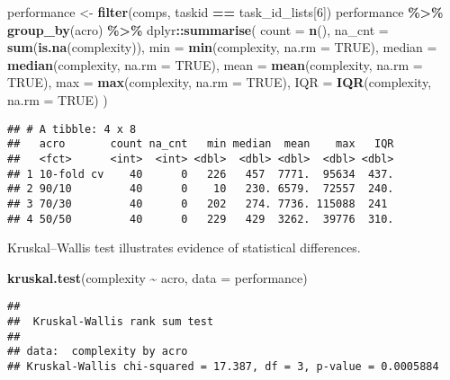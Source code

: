 \documentclass[
]{book}
\newenvironment{Shaded}{\begin{snugshade}}{\end{snugshade}}
\newcommand{\AttributeTok}[1]{\textcolor[rgb]{0.13,0.29,0.53}{#1}}
\newcommand{\ConstantTok}[1]{\textcolor[rgb]{0.56,0.35,0.01}{#1}}
\newcommand{\DecValTok}[1]{\textcolor[rgb]{0.00,0.00,0.81}{#1}}
\newcommand{\FunctionTok}[1]{\textcolor[rgb]{0.13,0.29,0.53}{\textbf{#1}}}
\newcommand{\NormalTok}[1]{#1}
\newcommand{\OtherTok}[1]{\textcolor[rgb]{0.56,0.35,0.01}{#1}}
\newcommand{\SpecialCharTok}[1]{\textcolor[rgb]{0.81,0.36,0.00}{\textbf{#1}}}
\begin{document}
\begin{Shaded}
\begin{Highlighting}[]
\NormalTok{performance }\OtherTok{\textless{}{-}} \FunctionTok{filter}\NormalTok{(comps, taskid }\SpecialCharTok{==}\NormalTok{ task\_id\_lists[}\DecValTok{6}\NormalTok{])}
\NormalTok{performance }\SpecialCharTok{\%\textgreater{}\%}
  \FunctionTok{group\_by}\NormalTok{(acro) }\SpecialCharTok{\%\textgreater{}\%}
\NormalTok{  dplyr}\SpecialCharTok{::}\FunctionTok{summarise}\NormalTok{(}
    \AttributeTok{count =} \FunctionTok{n}\NormalTok{(),}
    \AttributeTok{na\_cnt =} \FunctionTok{sum}\NormalTok{(}\FunctionTok{is.na}\NormalTok{(complexity)),}
    \AttributeTok{min =} \FunctionTok{min}\NormalTok{(complexity, }\AttributeTok{na.rm =} \ConstantTok{TRUE}\NormalTok{),}
    \AttributeTok{median =} \FunctionTok{median}\NormalTok{(complexity, }\AttributeTok{na.rm =} \ConstantTok{TRUE}\NormalTok{),}
    \AttributeTok{mean =} \FunctionTok{mean}\NormalTok{(complexity, }\AttributeTok{na.rm =} \ConstantTok{TRUE}\NormalTok{),}
    \AttributeTok{max =} \FunctionTok{max}\NormalTok{(complexity, }\AttributeTok{na.rm =} \ConstantTok{TRUE}\NormalTok{),}
    \AttributeTok{IQR =} \FunctionTok{IQR}\NormalTok{(complexity, }\AttributeTok{na.rm =} \ConstantTok{TRUE}\NormalTok{)}
\NormalTok{  )}
\end{Highlighting}
\end{Shaded}

\begin{verbatim}
## # A tibble: 4 x 8
##   acro       count na_cnt   min median  mean    max   IQR
##   <fct>      <int>  <int> <dbl>  <dbl> <dbl>  <dbl> <dbl>
## 1 10-fold cv    40      0   226   457  7771.  95634  437.
## 2 90/10         40      0    10   230. 6579.  72557  240.
## 3 70/30         40      0   202   274. 7736. 115088  241 
## 4 50/50         40      0   229   429  3262.  39776  310.
\end{verbatim}

Kruskal--Wallis test illustrates evidence of statistical differences.

\begin{Shaded}
\begin{Highlighting}[]
\FunctionTok{kruskal.test}\NormalTok{(complexity }\SpecialCharTok{\textasciitilde{}}\NormalTok{ acro, }\AttributeTok{data =}\NormalTok{ performance)}
\end{Highlighting}
\end{Shaded}

\begin{verbatim}
## 
##  Kruskal-Wallis rank sum test
## 
## data:  complexity by acro
## Kruskal-Wallis chi-squared = 17.387, df = 3, p-value = 0.0005884
\end{verbatim}
\end{document}
